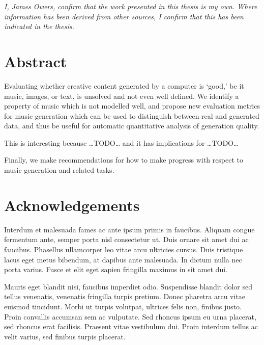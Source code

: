 \documentclass[12pt,a4paper,]{report}
\begin{document}
\noindent \textit{
I, James Owers, confirm that the work presented in this thesis is my own. Where information has been derived from other sources, I confirm that this has been indicated in the thesis.
} \vspace*{\fill}  \newpage

\hypertarget{abstract}{%
\chapter*{Abstract}\label{abstract}}

Evaluating whether creative content generated by a computer is `good,'
be it music, images, or text, is unsolved and not even well defined. We
identify a property of music which is not modelled well, and propose new
evaluation metrics for music generation which can be used to distinguish
between real and generated data, and thus be useful for automatic
quantitative analysis of generation quality.

This is interesting because \ldots TODO\ldots{} and it has implications
for \ldots TODO\ldots{}

Finally, we make recommendations for how to make progress with respect
to music generation and related tasks.

\setcounter{page}{1}

\hypertarget{acknowledgements}{%
\chapter*{Acknowledgements}\label{acknowledgements}}

Interdum et malesuada fames ac ante ipsum primis in faucibus. Aliquam
congue fermentum ante, semper porta nisl consectetur ut. Duis ornare sit
amet dui ac faucibus. Phasellus ullamcorper leo vitae arcu ultricies
cursus. Duis tristique lacus eget metus bibendum, at dapibus ante
malesuada. In dictum nulla nec porta varius. Fusce et elit eget sapien
fringilla maximus in sit amet dui.

Mauris eget blandit nisi, faucibus imperdiet odio. Suspendisse blandit
dolor sed tellus venenatis, venenatis fringilla turpis pretium. Donec
pharetra arcu vitae euismod tincidunt. Morbi ut turpis volutpat,
ultrices felis non, finibus justo. Proin convallis accumsan sem ac
vulputate. Sed rhoncus ipsum eu urna placerat, sed rhoncus erat
facilisis. Praesent vitae vestibulum dui. Proin interdum tellus ac velit
varius, sed finibus turpis placerat.
\end{document}
